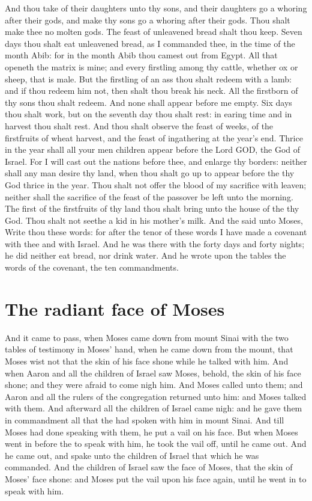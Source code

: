 \begin{biblechapter}
\verse And thou take of their daughters unto thy sons, and their daughters go a whoring after their gods, and make thy sons go a whoring after their gods.
\verse Thou shalt make thee no molten gods.
\verse The feast of unleavened bread shalt thou keep. Seven days thou shalt eat unleavened bread, as I commanded thee, in the time of the month Abib: for in the month Abib thou camest out from Egypt.
\verse All that openeth the matrix is mine; and every firstling among thy cattle, whether ox or sheep, that is male.
\verse But the firstling of an ass thou shalt redeem with a lamb: and if thou redeem him not, then shalt thou break his neck. All the firstborn of thy sons thou shalt redeem. And none shall appear before me empty.
\verse Six days thou shalt work, but on the seventh day thou shalt rest: in earing time and in harvest thou shalt rest.
\verse And thou shalt observe the feast of weeks, of the firstfruits of wheat harvest, and the feast of ingathering at the year's end.
\verse Thrice in the year shall all your men children appear before the Lord GOD, the God of Israel.
\verse For I will cast out the nations before thee, and enlarge thy borders: neither shall any man desire thy land, when thou shalt go up to appear before the \LORD thy God thrice in the year.
\verse Thou shalt not offer the blood of my sacrifice with leaven; neither shall the sacrifice of the feast of the passover be left unto the morning.
\verse The first of the firstfruits of thy land thou shalt bring unto the house of the \LORD thy God. Thou shalt not seethe a kid in his mother's milk.
\verse And the \LORD said unto Moses, Write thou these words: for after the tenor of these words I have made a covenant with thee and with Israel.
\verse And he was there with the \LORD forty days and forty nights; he did neither eat bread, nor drink water. And he wrote upon the tables the words of the covenant, the ten commandments.
\section*{The radiant face of Moses}
\verse And it came to pass, when Moses came down from mount Sinai with the two tables of testimony in Moses' hand, when he came down from the mount, that Moses wist not that the skin of his face shone while he talked with him.
\verse And when Aaron and all the children of Israel saw Moses, behold, the skin of his face shone; and they were afraid to come nigh him.
\verse And Moses called unto them; and Aaron and all the rulers of the congregation returned unto him: and Moses talked with them.
\verse And afterward all the children of Israel came nigh: and he gave them in commandment all that the \LORD had spoken with him in mount Sinai.
\verse And till Moses had done speaking with them, he put a vail on his face.
\verse But when Moses went in before the \LORD to speak with him, he took the vail off, until he came out. And he came out, and spake unto the children of Israel that which he was commanded.
\verse And the children of Israel saw the face of Moses, that the skin of Moses' face shone: and Moses put the vail upon his face again, until he went in to speak with him.
\end{biblechapter}

